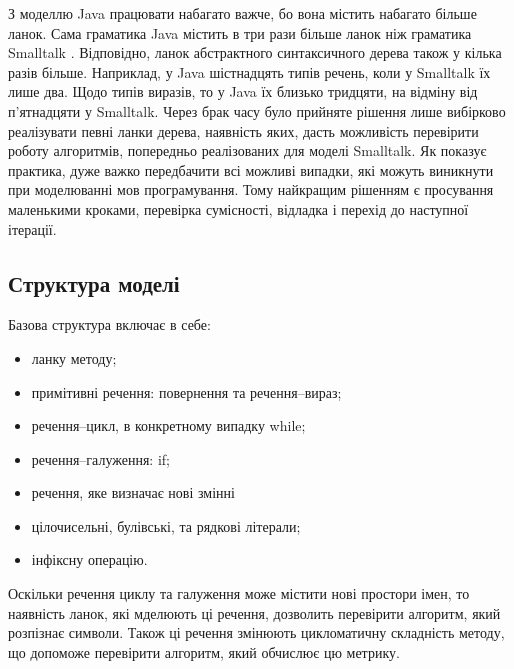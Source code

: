 \documentclass[12pt,a4paper]{article}
\begin{document}
З моделлю Java працювати набагато важче, бо вона містить набагато більше ланок. Сама граматика Java містить в три рази більше ланок ніж граматика Smalltalk \cite{meet-grammars}. Відповідно, ланок абстрактного синтаксичного дерева також у кілька разів більше. Наприклад, у Java шістнадцять типів речень, коли у Smalltalk їх лише два. Щодо типів виразів, то у Java їх близько тридцяти, на відміну від п'ятнадцяти у Smalltalk. Через брак часу було прийняте рішення лише вибірково реалізувати певні ланки дерева, наявність яких, дасть можливість перевірити роботу алгоритмів, попередньо реалізованих для моделі Smalltalk. Як показує практика, дуже важко передбачити всі можливі випадки, які можуть виникнути при моделюванні мов програмування. Тому найкращим рішенням є просування маленькими кроками, перевірка сумісності, відладка і перехід до наступної ітерації.

\subsection{Структура моделі}
Базова структура включає в себе:
\begin{itemize}
  \item ланку методу;
  \item примітивні речення: повернення та речення--вираз;
  \item речення--цикл, в конкретному випадку while;
  \item речення--галуження: if;
  \item речення, яке визначає нові змінні
  \item цілочисельні, булівські, та рядкові літерали;
  \item інфіксну операцію.
\end{itemize}

Оскільки речення циклу та галуження може містити нові простори імен, то наявність ланок, які мделюють ці речення, дозволить перевірити алгоритм, який розпізнає символи. Також ці речення змінюють цикломатичну складність методу, що допоможе перевірити алгоритм, який обчислює цю метрику. 
\end{document}
